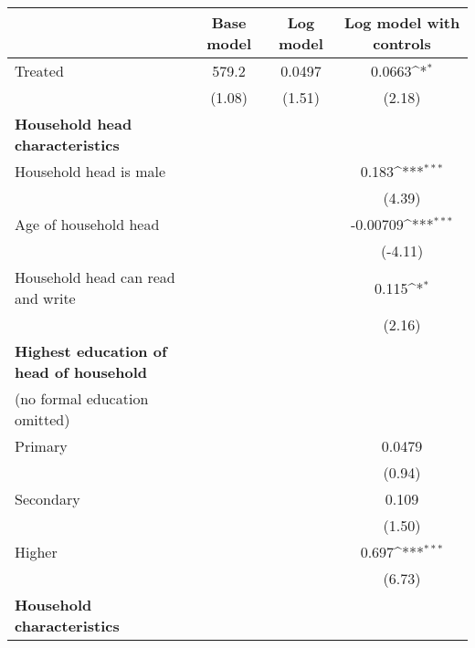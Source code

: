 {
\def\sym#1{\ifmmode^{#1}\else\(^{#1}\)\fi}
\begin{tabular}{l*{3}{c}}
\hline\hline
                    &\multicolumn{1}{c}{Base model}&\multicolumn{1}{c}{Log model}&\multicolumn{1}{c}{Log model with controls}\\
\hline
Treated             &       579.2         &      0.0497         &      0.0663\sym{*}  \\
                    &      (1.08)         &      (1.51)         &      (2.18)         \\
[1em]
\textbf{Household head characteristics}&                     &                     &                     \\
[1em]
Household head is male&                     &                     &       0.183\sym{***}\\
                    &                     &                     &      (4.39)         \\
[1em]
Age of household head&                     &                     &    -0.00709\sym{***}\\
                    &                     &                     &     (-4.11)         \\
[1em]
Household head can read and write&                     &                     &       0.115\sym{*}  \\
                    &                     &                     &      (2.16)         \\
[1em]
\textbf{Highest education of head of household} \\ (no formal education omitted)&                     &                     &                     \\
[1em]
Primary             &                     &                     &      0.0479         \\
                    &                     &                     &      (0.94)         \\
[1em]
Secondary           &                     &                     &       0.109         \\
                    &                     &                     &      (1.50)         \\
[1em]
Higher              &                     &                     &       0.697\sym{***}\\
                    &                     &                     &      (6.73)         \\
[1em]
\textbf{Household characteristics}&                     &                     &                     \\

\end{tabular}}
